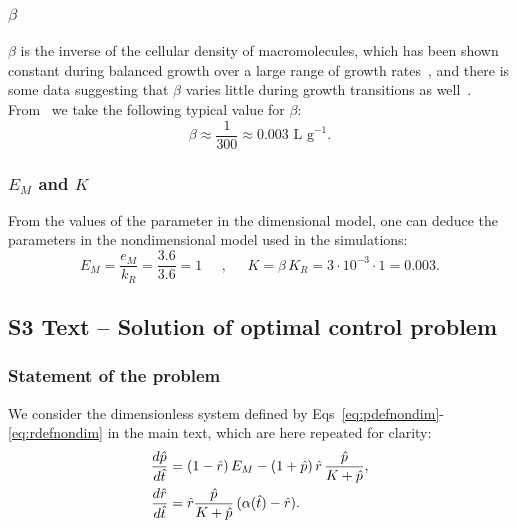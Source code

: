 \subsubsection{\Large \texorpdfstring{$\beta$}{Beta}}

$\beta$ is the inverse of the cellular density of macromolecules, which has been shown constant during balanced growth over a large range of growth rates~\cite{churchward_macromolecular_1982}, and there is some data suggesting that $\beta$ varies little during growth transitions as well~\cite{zhou_carbon_2013}.
From~\cite{zimmerman_estimation_1991,mcguffee_diffusion_2010} we take the following typical value for $\beta$:
\[
\beta \approx \frac{1}{300} \approx 0.003 \text{ L g}^{-1}.
\]

\subsubsection{\Large \texorpdfstring{$E_M$}{EM} and \texorpdfstring{$K$}{K}}

From the values of the parameter in the dimensional model, one can deduce the parameters in the nondimensional model used in the simulations:
\[
E_M = \frac{e_M}{k_R} = \frac{3.6}{3.6} = 1 \;\;\;\;\; , \;\;\;\;\;  K = \beta\, K_R = 3\cdot 10^{-3} \cdot 1 = 0.003.
\]

\clearpage

\subsection{S3 Text -- Solution of optimal control problem}

\subsubsection{Statement of the problem}

We consider the dimensionless system defined by Eqs~\ref{eq:pdefnondim}-\ref{eq:rdefnondim} in the main text, which are here repeated for clarity:
\begin{equation}{\label{eq:model}}
\begin{aligned}
\frac{d\hat{p}}{d\hat{t}} &= (1-\hat{r})\, E_M - (1+\hat{p})\, \hat{r} \, \frac{\hat{p}}{K+\hat{p}}, \\
\frac{d\hat{r}}{d\hat{t}} &= \hat{r} \frac{\hat{p}}{K + \hat{p}} \, (\alpha (\hat{t}) - \hat{r}).
\end{aligned}
\end{equation}

